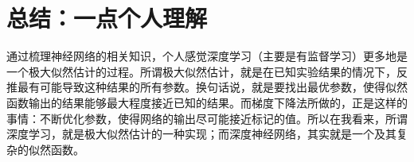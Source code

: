 \documentclass[UTF8]{ctexart}
\begin{document}
		

	\section{总结：一点个人理解}
	   \indent 通过梳理神经网络的相关知识，个人感觉深度学习（主要是有监督学习）更多地是一个极大似然估计的过程。所谓极大似然估计，就是在已知实验结果的情况下，反推最有可能导致这种结果的所有参数。换句话说，就是要找出最优参数，使得似然函数输出的结果能够最大程度接近已知的结果。而梯度下降法所做的，正是这样的事情：不断优化参数，使得网络的输出尽可能接近标记的值。所以在我看来，所谓深度学习，就是极大似然估计的一种实现；而深度神经网络，其实就是一个及其复杂的似然函数。
		
		

		
	
	
%
%

\end{document}

